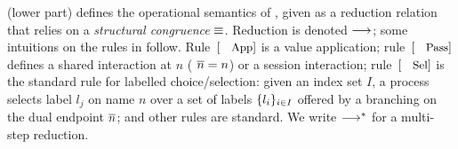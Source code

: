 \smallskip

\noindent {}
	 (lower part) defines the operational semantics 
of \HOp, given as
a reduction relation that relies 
on 
a \emph{structural congruence} $\equiv$. %
Reduction is denoted $\longrightarrow$; some intuitions on the rules in  %
follow.
Rule~$\orule{App}$ is a value application; 
rule~$\orule{Pass}$ defines a shared interaction at $n$ 
( $\overline{n}=n$) or a session interaction;  
rule~$\orule{Sel}$ is the standard rule for labelled choice/selection:
given an index set $I$, 
a process selects label $l_j$ on name $n$ over a set of
labels $\{l_i\}_{i \in I}$ offered by a branching 
on the dual endpoint $\overline{n}$; and other rules are standard.
We write $\longrightarrow^\ast$ for a multi-step reduction. 


